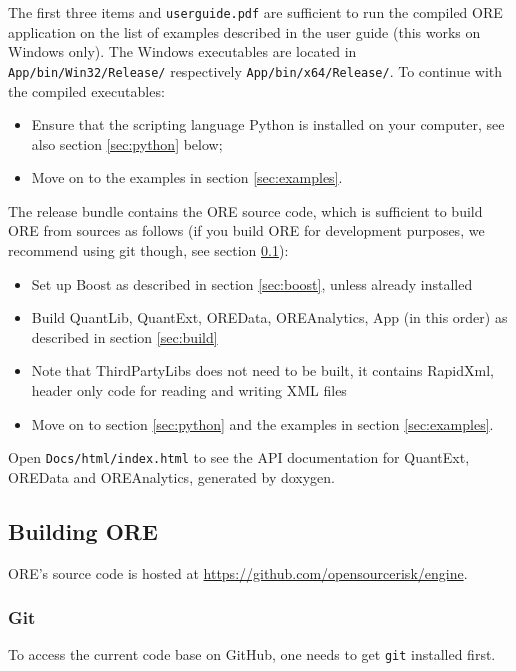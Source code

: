 \documentclass[12pt, a4paper]{article}
\begin{document}
The first three items and {\tt userguide.pdf} are sufficient to run the compiled ORE application
on the list of examples described in the user guide (this works on Windows only). The Windows executables are located in {\tt App/bin/Win32/Release/} respectively {\tt App/bin/x64/Release/}. To continue with the compiled
executables:
\begin{itemize}
\item Ensure that the scripting language Python is installed on your computer, see also section \ref{sec:python}
  below;
\item Move on to the examples in section \ref{sec:examples}.
\end{itemize}

\medskip
The release bundle contains the ORE source code, which is sufficient to build ORE from sources as follows (if you build ORE for development purposes, we recommend using git though, see section \ref{sec:build_ore}):
\begin{itemize}
\item Set up Boost as described in section \ref{sec:boost}, unless already installed
\item Build QuantLib, QuantExt, OREData, OREAnalytics, App (in this order) as described in section \ref{sec:build}
\item Note that ThirdPartyLibs does not need to be built, it contains RapidXml, header only code for reading and
  writing XML files
\item Move on to section \ref{sec:python} and the examples in section \ref{sec:examples}.
\end{itemize}

Open {\tt Docs/html/index.html} to see the API documentation for QuantExt, OREData and OREAnalytics, generated by
doxygen.

\subsection{Building ORE}\label{sec:build_ore}

ORE's source code is hosted at \url{https://github.com/opensourcerisk/engine}.

\subsubsection{Git}

To access the current code base on GitHub, one needs to get {\tt git} installed first.
   
\end{document}

